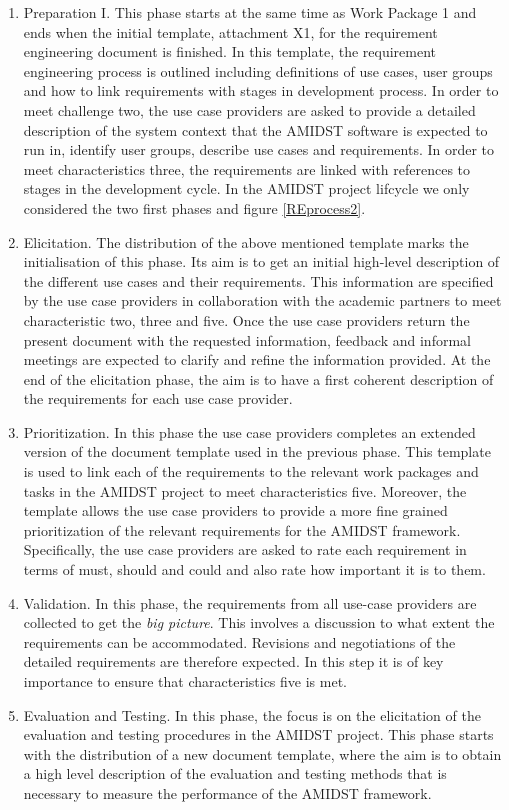 \documentclass[11pt, oneside]{article}   	%
\begin{document}
\begin{enumerate}
\item Preparation I.  This phase starts at the same time as Work Package 1 and ends when the initial template, attachment X1, for the requirement engineering document is finished.  In this template, the requirement engineering process is outlined including definitions of use cases, user groups and how to link requirements with stages in development process.  In order to meet challenge two, the use case providers are asked to provide a detailed description of the system context that the AMIDST software is expected to run in, identify user groups, describe use cases and requirements.  In order to meet characteristics three, the requirements are linked with references to stages in the development cycle.  In the AMIDST project lifcycle we only considered the two first phases and figure \ref{REprocess2}.
\item Elicitation. The distribution of the above mentioned template marks the initialisation of this phase.  Its aim is to get an initial high-level description of the different use cases and their requirements. This information are specified by the use case providers in collaboration with the academic partners to meet characteristic two, three and five.  Once the use case providers return the present document with the requested information, feedback and informal meetings are expected to clarify and refine the information provided.  At the end of the elicitation phase, the aim is to have a first coherent description of the requirements for each use case provider.
 \item Prioritization. In this phase the use case providers completes an extended version of the document template used in the previous phase. This template is used to link each of the requirements to the relevant work packages and tasks in the AMIDST project to meet characteristics five. Moreover, the template allows the use case providers to provide a more fine grained prioritization of the relevant requirements for the AMIDST framework.  Specifically, the use case providers are asked to rate each requirement in terms of must, should and could and also rate how important it is to them.  
\item Validation. In this phase, the requirements from all use-case providers are collected to get the \emph{big picture}.  This involves a discussion to what extent the requirements can be accommodated. Revisions and negotiations of the detailed requirements are therefore expected.  In this step it is of key importance to ensure that characteristics five is met.
 \item Evaluation and Testing. In this phase, the focus is on the elicitation of the evaluation and testing procedures in the AMIDST project. This phase starts with the distribution of a new document template, where the aim is to obtain a high level description of the evaluation and testing methods that is necessary to measure the performance of the AMIDST framework.
\end{enumerate}
\end{document}
